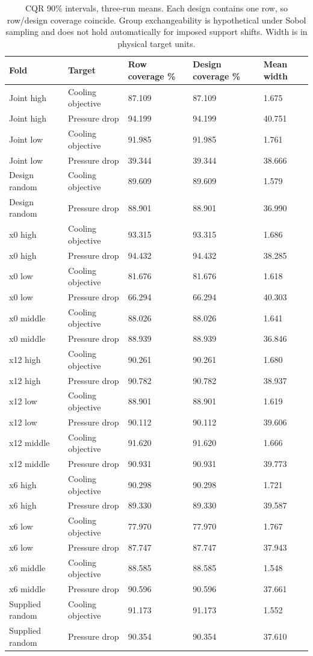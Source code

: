 \begin{table}[htbp]\centering\small\setlength{\tabcolsep}{3pt}\begin{tabular}{lllll}
\toprule
Fold & Target & Row coverage \% & Design coverage \% & Mean width\\\midrule
Joint high & Cooling objective & 87.109 & 87.109 & 1.675\\
Joint high & Pressure drop & 94.199 & 94.199 & 40.751\\
Joint low & Cooling objective & 91.985 & 91.985 & 1.761\\
Joint low & Pressure drop & 39.344 & 39.344 & 38.666\\
Design random & Cooling objective & 89.609 & 89.609 & 1.579\\
Design random & Pressure drop & 88.901 & 88.901 & 36.990\\
x0 high & Cooling objective & 93.315 & 93.315 & 1.686\\
x0 high & Pressure drop & 94.432 & 94.432 & 38.285\\
x0 low & Cooling objective & 81.676 & 81.676 & 1.618\\
x0 low & Pressure drop & 66.294 & 66.294 & 40.303\\
x0 middle & Cooling objective & 88.026 & 88.026 & 1.641\\
x0 middle & Pressure drop & 88.939 & 88.939 & 36.846\\
x12 high & Cooling objective & 90.261 & 90.261 & 1.680\\
x12 high & Pressure drop & 90.782 & 90.782 & 38.937\\
x12 low & Cooling objective & 88.901 & 88.901 & 1.619\\
x12 low & Pressure drop & 90.112 & 90.112 & 39.606\\
x12 middle & Cooling objective & 91.620 & 91.620 & 1.666\\
x12 middle & Pressure drop & 90.931 & 90.931 & 39.773\\
x6 high & Cooling objective & 90.298 & 90.298 & 1.721\\
x6 high & Pressure drop & 89.330 & 89.330 & 39.587\\
x6 low & Cooling objective & 77.970 & 77.970 & 1.767\\
x6 low & Pressure drop & 87.747 & 87.747 & 37.943\\
x6 middle & Cooling objective & 88.585 & 88.585 & 1.548\\
x6 middle & Pressure drop & 90.596 & 90.596 & 37.661\\
Supplied random & Cooling objective & 91.173 & 91.173 & 1.552\\
Supplied random & Pressure drop & 90.354 & 90.354 & 37.610\\
\bottomrule\end{tabular}\caption{CQR 90\% intervals, three-run means. Each design contains one row, so row/design coverage coincide. Group exchangeability is hypothetical under Sobol sampling and does not hold automatically for imposed support shifts. Width is in physical target units.}\label{tab:ubend-conformal_groups}\end{table}
